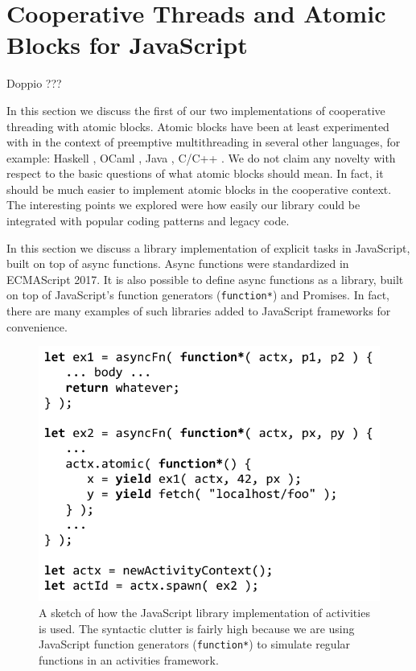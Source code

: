 \documentclass[acmsmall,anonymous,review]{acmart}\settopmatter{printfolios=true,printccs=false,printacmref=false}
\begin{document}
\section{Cooperative Threads and Atomic Blocks for JavaScript}

Doppio ??? \cite{Vilk2014}

In this section we discuss the first of our two implementations of cooperative threading with atomic blocks.
Atomic blocks have been at least experimented with in the context of preemptive multithreading in several other languages, for example: Haskell \cite{Harris2005}, OCaml \cite{Ringenburg2005}, Java \cite{Herlihy2006}, C/C++ \cite{Ni2008}.
We do not claim any novelty with respect to the basic questions of what atomic blocks should mean.
In fact, it should be much easier to implement atomic blocks in the cooperative context.
The interesting points we explored were how easily our library could be integrated with popular coding patterns and legacy code.

In this section we discuss a library implementation of explicit tasks in JavaScript, built on top of async functions.
Async functions were standardized in ECMAScript 2017.
It is also possible to define async functions as a library, built on top of JavaScript's function generators (\texttt{function*}) and Promises.
In fact, there are many examples of such libraries added to JavaScript frameworks for convenience.

\begin{figure}
\includegraphics[scale=0.65]{Code/trivial_js}
\caption{A sketch of how the JavaScript library implementation of activities is used.
The syntactic clutter is fairly high because we are using JavaScript function generators (\texttt{function*}) to simulate regular functions in an activities framework.}
\label{fig:trivial_js}
\end{figure}
\end{document}
